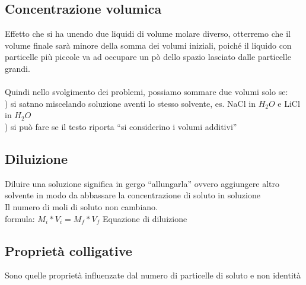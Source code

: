 \subsection{Concentrazione volumica}
Effetto che si ha unendo due liquidi di volume molare diverso, otterremo che il volume finale sarà minore della somma dei volumi iniziali, poiché il liquido con particelle più piccole va ad occupare un pò dello spazio lasciato dalle particelle grandi. \\\\
Quindi nello svolgimento dei problemi, possiamo sommare due volumi solo se:\\
) si satnno miscelando soluzione aventi lo stesso solvente, es. NaCl in $H_2O$ e LiCl in $H_2O$\\
) si può fare se il testo riporta “si considerino i volumi additivi”
\subsection{Diluizione}
Diluire una soluzione significa in gergo “allungarla” ovvero aggiungere altro solvente in modo da abbassare la concentrazione di soluto in soluzione\\
Il numero di moli di soluto non cambiano.\\
formula: $M_i * V_i = M_f * V_f$ Equazione di diluizione
\subsection{Proprietà colligative}
Sono quelle proprietà influenzate dal numero di particelle di soluto e non identità
